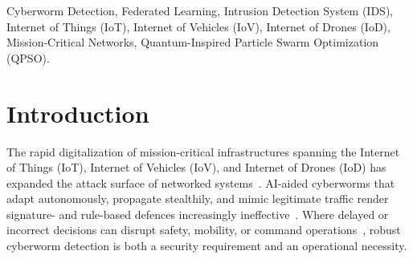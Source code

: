\documentclass[conference]{IEEEtran}
\begin{document}
\begin{abstract}
AI-aided cyberworms that adapt their propagation and mimic legitimate traffic threaten mission-critical IoT/IoV/IoD networks, where detectors must remain accurate, lightweight, and robust across distributed sites. This paper proposes CONQUEST, a context-aware, quantum-inspired intrusion detection framework that integrates causal context features, variable-qubit quantum-inspired particle swarm optimization (QPSO) for feature selection, and an LSTM(+VAE) temporal classifier, trained centrally or by horizontal federated learning. \textcolor{red}{Under a leakage-free temporal evaluation on ACI-IoT, CONQUEST achieves 97.13\% accuracy and F1-score, 0.9924 AUC, and the lowest missed-attack rate (3.33\%) among the evaluated pipelines.} \textcolor{red}{Multi-seed ablations show that detection is robust to the QPSO register size $Q\in\{1,\dots,10\}$ (Friedman $p\geq0.46$) and that context features and label-aware selection are complementary.} \textcolor{red}{The deployed detector classifies a traffic window in 2.98\,ms with 541\,MB peak memory.} \textcolor{red}{Under independent and identically distributed (IID) client
partitions, quantity-skew, and Dirichlet partitions, federated CONQUEST stays within 0.8\,pp of centralized F1, with a worst-client F1 of 96.37\% under quantity skew.} These results establish CONQUEST as a reproducible, deployable cyberworm detector for mission-critical networks.
\end{abstract}

\begin{IEEEkeywords}
Cyberworm Detection, Federated Learning, Intrusion Detection System (IDS), Internet of Things (IoT), Internet of Vehicles (IoV), Internet of Drones (IoD), Mission-Critical Networks, Quantum-Inspired Particle Swarm Optimization (QPSO).  
\end{IEEEkeywords}


\section{Introduction}
\label{sec:introduction}
The rapid digitalization of mission-critical infrastructures spanning
the Internet of Things (IoT), Internet of Vehicles (IoV), and Internet
of Drones (IoD) has expanded the attack surface of networked
systems~\cite{dritsas, ajakwe2024facets}. AI-aided cyberworms that
adapt autonomously, propagate stealthily, and mimic legitimate
traffic render signature- and rule-based defences increasingly
ineffective~\cite{khezri}. Where delayed or incorrect decisions can
disrupt safety, mobility, or command operations~\cite{amadi2026blockchain},
robust cyberworm detection is both a security requirement and an
operational necessity.
\end{document}
